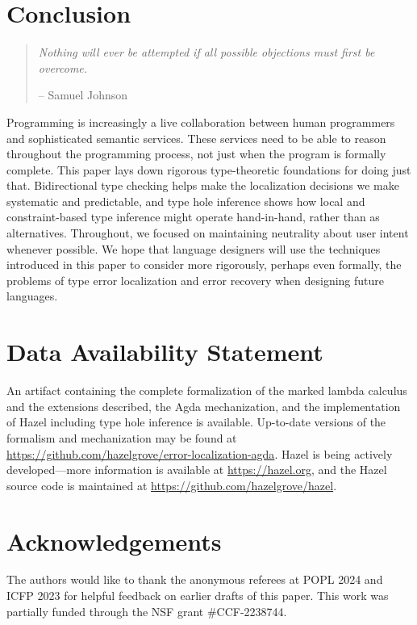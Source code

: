 \section{Conclusion}
\label{sec:conclusion}

\begin{quote}
    \emph{Nothing will ever be attempted if all possible objections must first be overcome.} 
    \begin{flushright}-- Samuel Johnson\end{flushright}
\end{quote}

Programming is increasingly a live collaboration between human programmers and sophisticated semantic services. These services need to be able to reason throughout the programming process, not just when the program is formally complete. This paper lays down rigorous type-theoretic foundations for doing just that. Bidirectional type checking helps make the localization decisions we make systematic and predictable, and type hole inference shows how local and constraint-based type inference might operate hand-in-hand, rather than as alternatives. Throughout, we focused on maintaining neutrality about user intent whenever possible. 
We hope that language designers will use the techniques introduced in this paper to consider more rigorously, perhaps even formally, the problems of type error localization and error recovery when designing future languages. 

\section*{Data Availability Statement}
An artifact \cite{zhao2023} containing the complete formalization of the marked lambda calculus and the extensions described, the Agda mechanization, and the implementation of Hazel including type hole inference is available.
Up-to-date versions of the formalism and mechanization may be found at \url{https://github.com/hazelgrove/error-localization-agda}.
Hazel is being actively developed---more information is available at \url{https://hazel.org}, and the Hazel source code is maintained at \url{https://github.com/hazelgrove/hazel}.

\section*{Acknowledgements}
The authors would like to thank the anonymous referees at POPL 2024 and ICFP 2023 for helpful feedback on earlier drafts of this paper.
This work was partially funded through the NSF grant \#CCF-2238744.

